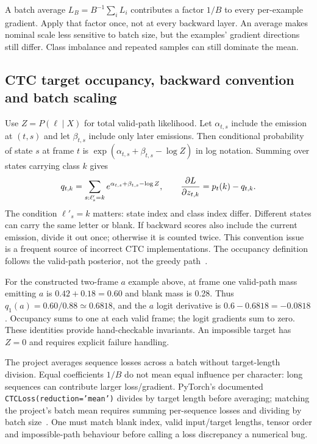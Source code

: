 A batch average $L_B=B^{-1}\sum_iL_i$ contributes a factor $1/B$ to every
per-example gradient. Apply that factor once, not at every backward layer.
An average makes nominal scale less sensitive to batch size, but the examples'
gradient directions still differ. Class imbalance and repeated samples can
still dominate the mean.

\subsection{CTC target occupancy, backward convention and batch scaling}
Use $Z=P(\ell\mid X)$ for total valid-path likelihood. Let
$\alpha_{t,s}$ include the emission at $(t,s)$ and let $\beta_{t,s}$
include only later emissions. Then conditional probability of state $s$ at
frame $t$ is $\exp(\alpha_{t,s}+\beta_{t,s}-\log Z)$ in log notation.
Summing over states carrying class $k$ gives
\[
q_{t,k}=\sum_{s:\ell'_s=k}
e^{\alpha_{t,s}+\beta_{t,s}-\log Z},\qquad
{\partial L\over\partial z_{t,k}}=p_t(k)-q_{t,k}.
\]
The condition $\ell'_s=k$ matters: state index and class index differ.
Different states can carry the same letter or blank. If backward scores
also include the current emission, divide it out once; otherwise it is
counted twice. This convention issue is a frequent source of incorrect
CTC implementations. The occupancy definition follows the valid-path
posterior, not the greedy path~\cite{gravesbook}.

For the constructed two-frame $a$ example above, at frame one valid-path
mass emitting $a$ is $0.42+0.18=0.60$ and blank mass is 0.28.
Thus $q_1(a)=0.60/0.88\simeq0.6818$, and the $a$ logit derivative is
$0.6-0.6818=-0.0818$. Occupancy sums to one at each valid frame; the logit
gradients sum to zero. These identities provide hand-checkable invariants.
An impossible target has $Z=0$ and requires explicit failure handling.

The project averages sequence losses across a batch without target-length
division. Equal coefficients $1/B$ do not mean equal influence per character:
long sequences can contribute larger loss/gradient. PyTorch's documented
\texttt{CTCLoss(reduction='mean')} divides by target length before averaging;
matching the project's batch mean requires summing per-sequence losses and
dividing by batch size~\cite{torchctc}. One must match blank index, valid
input/target lengths, tensor order and impossible-path behaviour before
calling a loss discrepancy a numerical bug.

